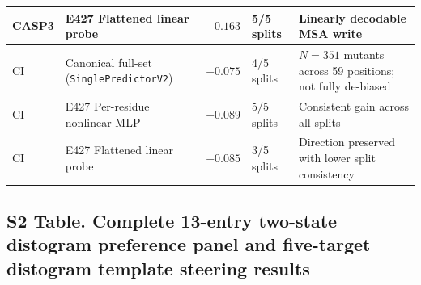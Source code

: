 \documentclass[10pt,a4paper]{article}
\begin{document}
\begin{table}[!ht]
\begin{tabularx}{\textwidth}{l l r l Y}
CASP3 & E427 Flattened linear probe & $+0.163$ & 5/5 splits & Linearly decodable MSA write \\
\midrule
CI & Canonical full-set (\texttt{SinglePredictorV2}) & $+0.075$ & 4/5 splits & $N=351$ mutants across 59 positions; not fully de-biased \\
CI & E427 Per-residue nonlinear MLP & $+0.089$ & 5/5 splits & Consistent gain across all splits \\
CI & E427 Flattened linear probe & $+0.085$ & 3/5 splits & Direction preserved with lower split consistency \\
\bottomrule
\end{tabularx}
\end{table}

\subsection*{S2 Table. Complete 13-entry two-state distogram preference panel and five-target distogram template steering results}
\end{document}
